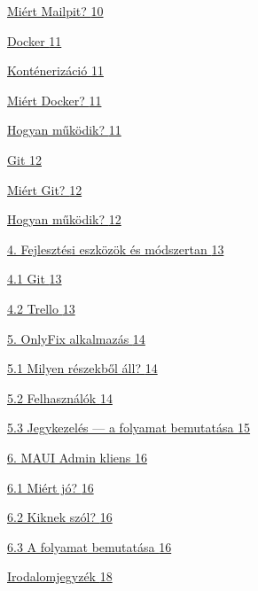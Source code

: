 \hyperref[miuxe9rt-mailpit]{Miért Mailpit? \hyperref[miuxe9rt-mailpit]{10}}

\hyperref[docker]{Docker \hyperref[docker]{11}}

\hyperref[kontuxe9nerizuxe1ciuxf3]{Konténerizáció \hyperref[kontuxe9nerizuxe1ciuxf3]{11}}

\hyperref[miuxe9rt-docker]{Miért Docker? \hyperref[miuxe9rt-docker]{11}}

\hyperref[hogyan-mux171kuxf6dik-5]{Hogyan működik? \hyperref[hogyan-mux171kuxf6dik-5]{11}}

\hyperref[git]{Git \hyperref[git]{12}}

\hyperref[miuxe9rt-git]{Miért Git? \hyperref[miuxe9rt-git]{12}}

\hyperref[hogyan-mux171kuxf6dik-6]{Hogyan működik? \hyperref[hogyan-mux171kuxf6dik-6]{12}}

\hyperref[_Toc223012185]{4. Fejlesztési eszközök és módszertan \hyperref[_Toc223012185]{13}}

\hyperref[git-1]{4.1 Git \hyperref[git-1]{13}}

\hyperref[trello]{4.2 Trello \hyperref[trello]{13}}

\hyperref[_Toc223012186]{5. OnlyFix alkalmazás \hyperref[_Toc223012186]{14}}

\hyperref[milyen-ruxe9szekbux151l-uxe1ll]{5.1 Milyen részekből áll? \hyperref[milyen-ruxe9szekbux151l-uxe1ll]{14}}

\hyperref[felhasznuxe1luxf3k]{5.2 Felhasználók \hyperref[felhasznuxe1luxf3k]{14}}

\hyperref[jegykezeluxe9s-a-folyamat-bemutatuxe1sa]{5.3 Jegykezelés --- a folyamat bemutatása \hyperref[jegykezeluxe9s-a-folyamat-bemutatuxe1sa]{15}}

\hyperref[_Toc223012187]{6. MAUI Admin kliens \hyperref[_Toc223012187]{16}}

\hyperref[miuxe9rt-juxf3]{6.1 Miért jó? \hyperref[miuxe9rt-juxf3]{16}}

\hyperref[kiknek-szuxf3l]{6.2 Kiknek szól? \hyperref[kiknek-szuxf3l]{16}}

\hyperref[a-folyamat-bemutatuxe1sa]{6.3 A folyamat bemutatása \hyperref[a-folyamat-bemutatuxe1sa]{16}}

\hyperref[irodalomjegyzuxe9k]{Irodalomjegyzék \hyperref[irodalomjegyzuxe9k]{18}}

\chapter{}\label{section-1}

